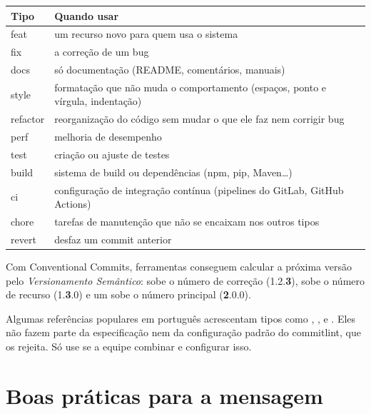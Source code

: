 \begin{center}
\renewcommand{\arraystretch}{1.3}
\begin{tabularx}{\linewidth}{@{}>{\ttfamily\color{azulMB}}l X@{}}
\toprule
\textrm{\textbf{Tipo}} & \textbf{Quando usar} \\
\midrule
feat & um recurso novo para quem usa o sistema \\
fix & a correção de um bug \\
docs & só documentação (README, comentários, manuais) \\
style & formatação que não muda o comportamento (espaços, ponto e vírgula, indentação) \\
refactor & reorganização do código sem mudar o que ele faz nem corrigir bug \\
perf & melhoria de desempenho \\
test & criação ou ajuste de testes \\
build & sistema de build ou dependências (npm, pip, Maven\ldots) \\
ci & configuração de integração contínua (pipelines do GitLab, GitHub Actions) \\
chore & tarefas de manutenção que não se encaixam nos outros tipos \\
revert & desfaz um commit anterior \\
\bottomrule
\end{tabularx}
\end{center}

\begin{dica}
Com Conventional Commits, ferramentas conseguem calcular a próxima versão pelo \emph{Versionamento Semântico}:  sobe o número de correção (1.2.\textbf{3}),  sobe o número de recurso (1.\textbf{3}.0) e um  sobe o número principal (\textbf{2}.0.0).
\end{dica}

\begin{atencao}
Algumas referências populares em português acrescentam tipos como , ,  e . Eles não fazem parte da especificação nem da configuração padrão do commitlint, que os rejeita. Só use se a equipe combinar e configurar isso.
\end{atencao}

\section{Boas práticas para a mensagem}


